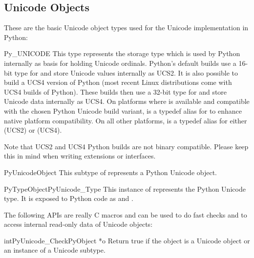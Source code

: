 \subsection{Unicode Objects \label{unicodeObjects}}


These are the basic Unicode object types used for the Unicode
implementation in Python:

\begin{ctypedesc}{Py_UNICODE}
  This type represents the storage type which is used by Python
  internally as basis for holding Unicode ordinals.  Python's default
  builds use a 16-bit type for  and store Unicode
  values internally as UCS2. It is also possible to build a UCS4
  version of Python (most recent Linux distributions come with UCS4
  builds of Python). These builds then use a 32-bit type for
   and store Unicode data internally as UCS4. On
  platforms where  is available and compatible with the
  chosen Python Unicode build variant,  is a typedef
  alias for  to enhance native platform compatibility.
  On all other platforms,  is a typedef alias for
  either  (UCS2) or 
  (UCS4).
\end{ctypedesc}

Note that UCS2 and UCS4 Python builds are not binary compatible.
Please keep this in mind when writing extensions or interfaces.

\begin{ctypedesc}{PyUnicodeObject}
  This subtype of  represents a Python Unicode object.
\end{ctypedesc}

\begin{cvardesc}{PyTypeObject}{PyUnicode_Type}
  This instance of  represents the Python Unicode
  type.  It is exposed to Python code as  and
  .
\end{cvardesc}

The following APIs are really C macros and can be used to do fast
checks and to access internal read-only data of Unicode objects:

\begin{cfuncdesc}{int}{PyUnicode_Check}{PyObject *o}
  Return true if the object  is a Unicode object or an
  instance of a Unicode subtype.
\end{cfuncdesc}

